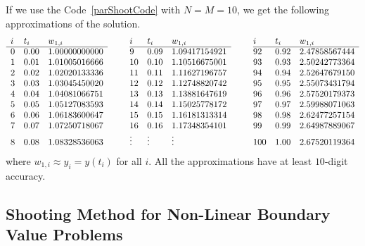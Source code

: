 \begin{egg}
If we use the Code~\ref{parShootCode} with $N = M = 10$, we get the
following approximations of the solution.
\[
\begin{array}{lllc@{\hspace{2em}}lllc@{\hspace{2em}}lll}
i & t_i & w_{1,i} & & i & t_i & w_{1,i} & & i & t_i & w_{1,i} \\ 
\cline{1-3} \cline{5-7} \cline{9-11}
0 & 0.00 & 1.00000000000 && 9 & 0.09 & 1.09417154921 && 92 & 0.92 & 2.47858567444 \\
1 & 0.01 & 1.01005016666 && 10 & 0.10 & 1.10516675001 && 93 & 0.93 & 2.50242773364 \\
2 & 0.02 & 1.02020133336 && 11 & 0.11 & 1.11627196757 && 94 & 0.94 & 2.52647679150 \\
3 & 0.03 & 1.03045450020 && 12 & 0.12 & 1.12748820742 && 95 & 0.95 & 2.55073431794 \\
4 & 0.04 & 1.04081066751 && 13 & 0.13 & 1.13881647619 && 96 & 0.96 & 2.57520179373 \\
5 & 0.05 & 1.05127083593 && 14 & 0.14 & 1.15025778172 && 97 & 0.97 & 2.59988071063 \\
6 & 0.06 & 1.06183600647 && 15 & 0.15 & 1.16181313314 && 98 & 0.98 & 2.62477257154 \\
7 & 0.07 & 1.07250718067 && 16 & 0.16 & 1.17348354101 && 99 & 0.99 & 2.64987889067 \\
8 & 0.08 & 1.08328536063 && \vdots & \vdots & \vdots && 100 & 1.00 & 2.67520119364
\end{array}
\]
where $w_{1,i} \approx y_i = y(t_i)$ for all $i$.
All the approximations have at least $10$-digit accuracy.
\end{egg}

\subsection{Shooting Method for Non-Linear Boundary Value
Problems}\label{simpleShootM}

